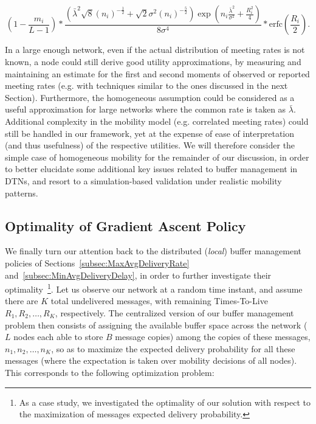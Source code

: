 \footnotesize
\begin{equation}
(1 - \frac{m_i}{L-1}) * \frac{ (\bar{\lambda}^{2} \sqrt{8} (n_{i})^{-\frac{1}{2}} + \sqrt{2} \sigma^{2} (n_{i})^{-\frac{5}{2}}) \exp( n_{i} \frac{\bar{\lambda}^{2}}{\sigma^{2}} + \frac{R_{i}^{2}}{4} )}{8 \sigma^{4}} * \mbox{erfc}(\frac{R_{i}}{2}).
\end{equation}
\normalsize

In a large enough network, even if the actual distribution of meeting rates is not known, a node could still derive good utility approximations, by measuring and maintaining an estimate for the first and second moments of observed or reported meeting rates (e.g. with techniques similar to the ones discussed in the next Section). Furthermore, the homogeneous assumption could be considered as a useful approximation for large networks where the common rate is taken as $\bar{\lambda}$. Additional complexity in the mobility model (e.g. correlated meeting rates) could still be handled in our framework, yet at the expense of ease of interpretation (and thus usefulness) of the respective utilities. We will therefore consider the simple case of homogeneous mobility for the remainder of our discussion, in order to better elucidate some additional key issues related to buffer management in DTNs, and resort to a simulation-based validation under realistic mobility patterns.

\subsection{Optimality of Gradient Ascent Policy}
\label{OptimalityOfGradientPolicy}

We finally turn our attention back to the distributed (\emph{local}) buffer management policies of Sections~\ref{subsec:MaxAvgDeliveryRate} and~\ref{subsec:MinAvgDeliveryDelay}, in order to further investigate their optimality~\footnote{As a case study, we investigated the optimality of our solution with respect to the maximization of messages expected delivery probability.}. Let us observe our network at a random time instant, and assume there are $K$ total undelivered messages, with remaining Times-To-Live $R_{1}, R_{2}, \dots, R_{K}$, respectively. The centralized version of our buffer management problem then consists of assigning the available buffer space across the network ($L$ nodes each able to store $B$ message copies) among the copies of these messages, $n_{1}, n_{2}, \dots, n_{K}$, so as to maximize the expected delivery probability for all these messages (where the expectation is taken over mobility decisions of all nodes). This corresponds to the following optimization problem:

